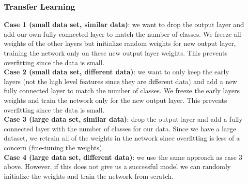 \documentclass[11pt, a4paper]{article}
\begin{document}
\begin{spacing}{1.1}
	\subsubsection{Transfer Learning}
	\textbf{Case 1 (small data set, similar data)}: we want to drop the output layer and add our own fully connected layer to match the number of classes. We freeze all weights of the other layers but initialize random weights for new output layer, training the network only on these new output layer weights. This prevents overfitting since the data is small. \vspace*{2mm}\\
	\textbf{Case 2 (small data set, different data)}: we want to only keep the early layers (not the high level features since they are different data) and add a new fully connected layer to match the number of classes. We freeze the early layers weights and train the network only for the new output layer. This prevents overfitting since the data is small. \vspace*{2mm}\\
	\textbf{Case 3 (large data set, similar data)}: drop the output layer and add a fully connected layer with the number of classes for our data. Since we have a large dataset, we retrain all of the weights in the network since overfitting is less of a concern (fine-tuning the weights).\vspace*{2mm}\\
	\textbf{Case 4 (large data set, different data)}: we use the same approach as case 3 above. However, if this does not give us a successful model we can randomly initialize the weights and train the network from scratch.
	

	
	
	
	
	
\end{spacing}
\end{document}
